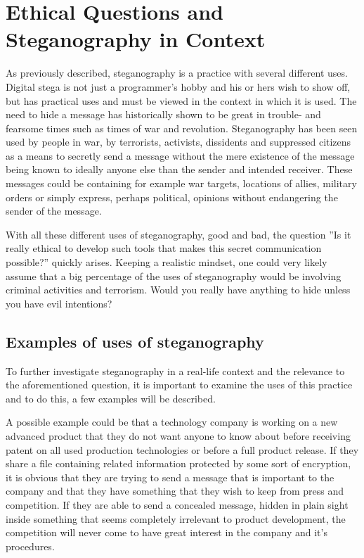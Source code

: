 \section{Ethical Questions and Steganography in Context}
As previously described, steganography is a practice with several different uses.
Digital stega is not just a programmer's hobby and his or hers wish to show off, but has practical uses and must be viewed in the context in which it is used.
The need to hide a message has historically shown to be great in trouble- and fearsome times such as times of war and revolution.
Steganography has been seen used by people in war, by terrorists, activists, dissidents and suppressed citizens as a means to secretly send a message without the mere existence of the message being known to ideally anyone else than the sender and intended receiver.
These messages could be containing for example war targets, locations of allies, military orders or simply express, perhaps political, opinions without endangering the sender of the message.


With all these different uses of steganography, good and bad, the question ''Is it really ethical to develop such tools that makes this secret communication possible?'' quickly arises. Keeping a realistic mindset, one could very likely assume that a big percentage of the uses of steganography would be involving criminal activities and terrorism. Would you really have anything to hide unless you have evil intentions?

\subsection{Examples of uses of steganography}
To further investigate steganography in a real-life context and the relevance to the aforementioned question, it is important to examine the uses of this practice and to do this, a few examples will be described.

A possible example could be that a technology company is working on a new advanced product that they do not want anyone to know about before receiving patent on all used production technologies or before a full product release.
If they share a file containing related information protected by some sort of encryption, it is obvious that they are trying to send a message that is important to the company and that they have something that they wish to keep from press and competition.
If they are able to send a concealed message, hidden in plain sight inside something that seems completely irrelevant to product development, the competition will never come to have great interest in the company and it's procedures.

